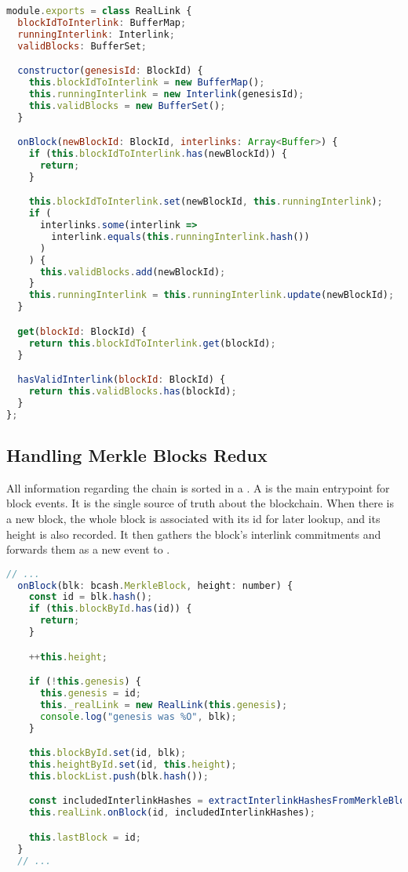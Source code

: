 \begin{lstlisting}[language=Javascript]
module.exports = class RealLink {
  blockIdToInterlink: BufferMap;
  runningInterlink: Interlink;
  validBlocks: BufferSet;

  constructor(genesisId: BlockId) {
    this.blockIdToInterlink = new BufferMap();
    this.runningInterlink = new Interlink(genesisId);
    this.validBlocks = new BufferSet();
  }

  onBlock(newBlockId: BlockId, interlinks: Array<Buffer>) {
    if (this.blockIdToInterlink.has(newBlockId)) {
      return;
    }

    this.blockIdToInterlink.set(newBlockId, this.runningInterlink);
    if (
      interlinks.some(interlink =>
        interlink.equals(this.runningInterlink.hash())
      )
    ) {
      this.validBlocks.add(newBlockId);
    }
    this.runningInterlink = this.runningInterlink.update(newBlockId);
  }

  get(blockId: BlockId) {
    return this.blockIdToInterlink.get(blockId);
  }

  hasValidInterlink(blockId: BlockId) {
    return this.validBlocks.has(blockId);
  }
};
\end{lstlisting}

\subsection{Handling Merkle Blocks Redux}
All information regarding the chain is sorted in a . A  is the main entrypoint for block events. It is the single source of truth about the blockchain. When there is a new block, the whole block is associated with its id for later lookup, and its height is also recorded. It then gathers the block's interlink commitments and forwards them as a new event to .

\begin{lstlisting}[language=Javascript]
  // ...
  onBlock(blk: bcash.MerkleBlock, height: number) {
    const id = blk.hash();
    if (this.blockById.has(id)) {
      return;
    }

    ++this.height;

    if (!this.genesis) {
      this.genesis = id;
      this._realLink = new RealLink(this.genesis);
      console.log("genesis was %O", blk);
    }

    this.blockById.set(id, blk);
    this.heightById.set(id, this.height);
    this.blockList.push(blk.hash());

    const includedInterlinkHashes = extractInterlinkHashesFromMerkleBlock(blk);
    this.realLink.onBlock(id, includedInterlinkHashes);

    this.lastBlock = id;
  }
  // ...
\end{lstlisting}

